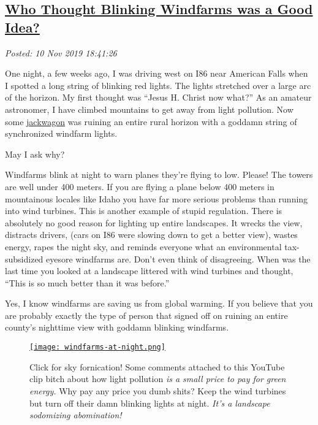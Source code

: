 %


\subsection*{\href{https://analyzethedatanotthedrivel.org/2019/11/10/who-thought-blinking-windfarms-was-a-good-idea/}{Who Thought Blinking Windfarms was a Good Idea?}}


\noindent\emph{Posted: 10 Nov 2019 18:41:26}
\vspace{6pt}

One night, a few weeks ago, I was driving west on I86 near American
Falls when I spotted a long string of blinking red lights. The
lights stretched over a large arc of the horizon. My first thought was
``Jesus H. Christ now what?'' As an amateur astronomer, I have climbed
mountains to get away from light pollution. Now some 
\href{https://www.urbandictionary.com/define.php?term=Jack%20wagon}{jackwagon} was
ruining an entire rural horizon with a goddamn string of synchronized
windfarm lights.

May I ask why?

Windfarms blink at night to warn planes they're flying to low. Please!
The towers are well under 400 meters. If you are flying a plane below
400 meters in mountainous locales like Idaho you have far more serious
problems than running into wind turbines. This is another example of
stupid regulation. There is absolutely no good reason for lighting up
entire landscapes. It wrecks the view, distracts drivers, (cars on I86
were slowing down to get a better view), wastes energy, rapes the night
sky, and reminds everyone what an environmental tax-subsidized eyesore
windfarms are. Don't even think of disagreeing. When was the last time
you looked at a landscape littered with wind turbines and thought,
``This is so much better than it was before.''

Yes, I know windfarms are saving us from global warming. If you believe
that you are probably exactly the type of person that signed off on
ruining an entire county's nighttime view with goddamn blinking
windfarms.


\captionsetup[figure]{labelformat=empty}
\begin{SCfigure}[30][!h]
\centering
\href{https://www.youtube.com/watch?v=JDztGwEqiwQ}{\texttt{[image: windfarms-at-night.png]}}
\caption[Click for sky fornication]{Click for sky fornication! Some comments attached to this YouTube clip bitch about how light pollution \emph{is
a small price to pay for green energy.} Why pay any price you dumb shits? Keep the wind turbines
but turn off their damn blinking lights at night. \emph{It's a landscape sodomizing abomination!}}
\label{fig:5643x0}
\end{SCfigure}

